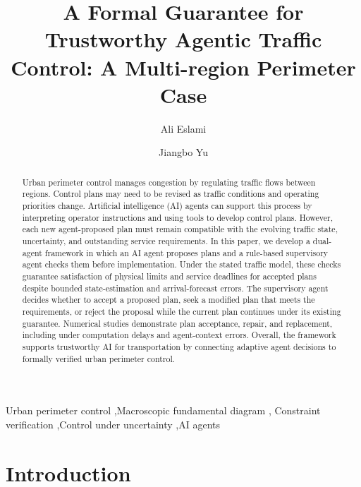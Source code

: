 \documentclass[final]{cas-sc}
\theoremstyle{definition}
\theoremstyle{plain}
\theoremstyle{definition}
\theoremstyle{plain}
\begin{document}
\title[mode=title]{A Formal Guarantee for Trustworthy Agentic Traffic Control: A Multi-region Perimeter Case}
\author[mcgill]{Ali Eslami}
\author[mcgill]{Jiangbo Yu}
\cormark[1]
\begin{abstract}
Urban perimeter control manages congestion by regulating traffic flows
between regions. Control plans may need to be revised as traffic conditions
and operating priorities change. Artificial intelligence (AI) agents can
support this process by interpreting operator instructions and using tools
to develop control plans. However, each new agent-proposed plan must remain
compatible with the evolving traffic state, uncertainty, and outstanding
service requirements. In this paper, we develop a dual-agent framework in
which an AI agent proposes plans and a rule-based supervisory agent checks
them before implementation. Under the stated traffic model, these checks
guarantee satisfaction of physical limits and service deadlines for accepted
plans despite bounded state-estimation and arrival-forecast errors. The
supervisory agent decides whether to accept a proposed plan, seek a modified
plan that meets the requirements, or reject the proposal while the current
plan continues under its existing guarantee.
Numerical studies demonstrate plan acceptance, repair, and replacement,
including under computation delays and agent-context errors. Overall, the
framework supports trustworthy AI for transportation by connecting adaptive
agent decisions to formally verified urban perimeter control.
\end{abstract}
\begin{keywords}
Urban perimeter control \sep Macroscopic fundamental diagram \sep
Constraint verification \sep Control under uncertainty \sep AI agents
\end{keywords}
\maketitle


\section{Introduction}
\label{sec:new-introduction}
\end{document}
